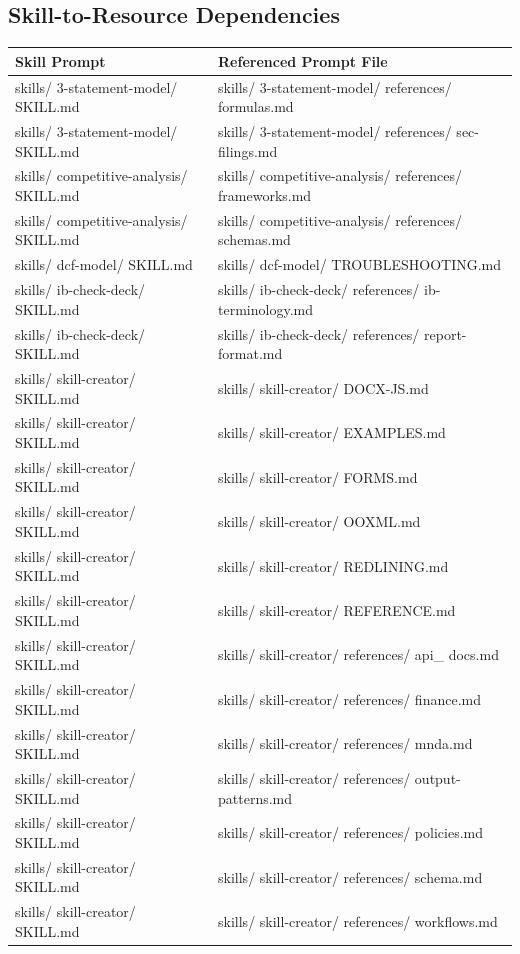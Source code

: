 \documentclass[11pt]{article}
\begin{document}
\subsection{Skill-to-Resource Dependencies}

\begingroup
\small
\setlength{\tabcolsep}{2pt}
\begin{longtable}{>{\RaggedRight\arraybackslash\hspace{0pt}}p{}>{\RaggedRight\arraybackslash\hspace{0pt}}p{}}
\toprule
{} \textbf{Skill Prompt} & \textbf{Referenced Prompt File} \\
\midrule
{} skills/ 3-statement-model/ SKILL.md & skills/ 3-statement-model/ references/ formulas.md \\
{} skills/ 3-statement-model/ SKILL.md & skills/ 3-statement-model/ references/ sec-filings.md \\
{} skills/ competitive-analysis/ SKILL.md & skills/ competitive-analysis/ references/ frameworks.md \\
{} skills/ competitive-analysis/ SKILL.md & skills/ competitive-analysis/ references/ schemas.md \\
{} skills/ dcf-model/ SKILL.md & skills/ dcf-model/ TROUBLESHOOTING.md \\
{} skills/ ib-check-deck/ SKILL.md & skills/ ib-check-deck/ references/ ib-terminology.md \\
{} skills/ ib-check-deck/ SKILL.md & skills/ ib-check-deck/ references/ report-format.md \\
{} skills/ skill-creator/ SKILL.md & skills/ skill-creator/ DOCX-JS.md \\
{} skills/ skill-creator/ SKILL.md & skills/ skill-creator/ EXAMPLES.md \\
{} skills/ skill-creator/ SKILL.md & skills/ skill-creator/ FORMS.md \\
{} skills/ skill-creator/ SKILL.md & skills/ skill-creator/ OOXML.md \\
{} skills/ skill-creator/ SKILL.md & skills/ skill-creator/ REDLINING.md \\
{} skills/ skill-creator/ SKILL.md & skills/ skill-creator/ REFERENCE.md \\
{} skills/ skill-creator/ SKILL.md & skills/ skill-creator/ references/ api\_\allowbreak{} docs.md \\
{} skills/ skill-creator/ SKILL.md & skills/ skill-creator/ references/ finance.md \\
{} skills/ skill-creator/ SKILL.md & skills/ skill-creator/ references/ mnda.md \\
{} skills/ skill-creator/ SKILL.md & skills/ skill-creator/ references/ output-patterns.md \\
{} skills/ skill-creator/ SKILL.md & skills/ skill-creator/ references/ policies.md \\
{} skills/ skill-creator/ SKILL.md & skills/ skill-creator/ references/ schema.md \\
{} skills/ skill-creator/ SKILL.md & skills/ skill-creator/ references/ workflows.md \\
\bottomrule
\end{longtable}
\endgroup
\end{document}
